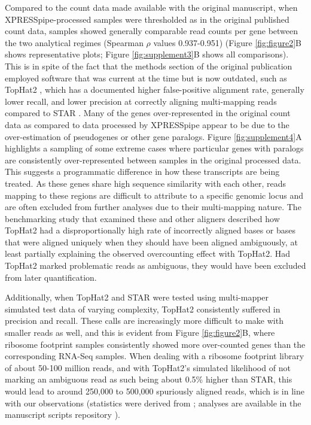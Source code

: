 \documentclass[10pt, oneside]{article}
\begin{document}
Compared to the count data made available with the original manuscript, when XPRESSpipe-processed samples were thresholded as in the original published count data, samples showed generally comparable read counts per gene between the two analytical regimes (Spearman $\rho$ values 0.937-0.951) (Figure \ref{fig:figure2}B shows representative plots; Figure \ref{fig:supplement3}B shows all comparisons). This is in spite of the fact that the methods section of the original publication employed software that was current at the time but is now outdated, such as TopHat2 \cite{tophat2}, which has a documented higher false-positive alignment rate, generally lower recall, and lower precision at correctly aligning multi-mapping reads compared to STAR \cite{alignment_benchmark, alignment_benchmark2, star}. Many of the genes over-represented in the original count data as compared to data processed by XPRESSpipe appear to be due to the over-estimation of pseudogenes or other gene paralogs. Figure \ref{fig:supplement4}A highlights a sampling of some extreme cases where particular genes with paralogs are consistently over-represented between samples in the original processed data. This suggests a programmatic difference in how these transcripts are being treated. As these genes share high sequence similarity with each other, reads mapping to these regions are difficult to attribute to a specific genomic locus and are often excluded from further analyses due to their multi-mapping nature. The benchmarking study \cite{alignment_benchmark} that examined these and other aligners described how TopHat2 had a disproportionally high rate of incorrectly aligned bases or bases that were aligned uniquely when they should have been aligned ambiguously, at least partially explaining the observed overcounting effect with TopHat2. Had TopHat2 marked problematic reads as ambiguous, they would have been excluded from later quantification.\par

Additionally, when TopHat2 and STAR were tested using multi-mapper simulated test data of varying complexity, TopHat2 consistently suffered in precision and recall. These calls are increasingly more difficult to make with smaller reads as well, and this is evident from Figure \ref{fig:figure2}B, where ribosome footprint samples consistently showed more over-counted genes than the corresponding RNA-Seq samples. When dealing with a ribosome footprint library of about 50-100 million reads, and with TopHat2's simulated likelihood of not marking an ambiguous read as such being about 0.5\% higher than STAR, this would lead to around 250,000 to 500,000 spuriously aligned reads, which is in line with our observations (statistics were derived from \cite{alignment_benchmark}; analyses are available in the manuscript scripts repository \cite{manuscript}).\par
\end{document}

